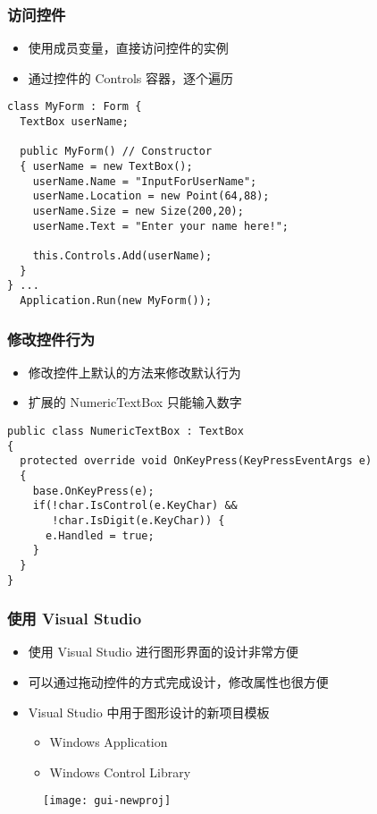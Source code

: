\begin{frame}[fragile]
\frametitle{访问控件}
\begin{itemize}
\item 使用成员变量，直接访问控件的实例
\item 通过控件的 Controls 容器，逐个遍历
\end{itemize}
\begin{lstlisting}
class MyForm : Form {
  TextBox userName;
  
  public MyForm() // Constructor
  { userName = new TextBox();
    userName.Name = "InputForUserName";
    userName.Location = new Point(64,88);
    userName.Size = new Size(200,20);
    userName.Text = "Enter your name here!";

    this.Controls.Add(userName);
  }
} ...
  Application.Run(new MyForm());
\end{lstlisting}
\end{frame}

\begin{frame}[fragile]
\frametitle{修改控件行为}
\begin{itemize}
\item 修改控件上默认的方法来修改默认行为
\item 扩展的 NumericTextBox 只能输入数字
\end{itemize}
\begin{lstlisting}
public class NumericTextBox : TextBox
{
  protected override void OnKeyPress(KeyPressEventArgs e)
  {
    base.OnKeyPress(e);
    if(!char.IsControl(e.KeyChar) && 
       !char.IsDigit(e.KeyChar)) {
      e.Handled = true;
    }
  }
}
\end{lstlisting}
\end{frame}

\begin{frame}
\frametitle{使用 Visual Studio}
\begin{itemize}
\item 使用 Visual Studio 进行图形界面的设计非常方便
\item 可以通过拖动控件的方式完成设计，修改属性也很方便
\item Visual Studio 中用于图形设计的新项目模板
\begin{itemize}
\item Windows Application
\item Windows Control Library
\end{itemize}
\end{itemize}
\begin{figure}[htbp]
  \centering
  \texttt{[image: gui-newproj]}
\end{figure}
\end{frame}

